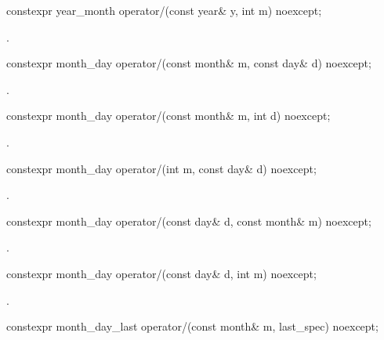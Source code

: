 \begin{itemdecl}
constexpr year_month
  operator/(const year& y, int   m) noexcept;
\end{itemdecl}

\begin{itemdescr}
\pnum
\returns
{}.
\end{itemdescr}

\begin{itemdecl}
constexpr month_day
  operator/(const month& m, const day& d) noexcept;
\end{itemdecl}

\begin{itemdescr}
\pnum
\returns
{}.
\end{itemdescr}

\begin{itemdecl}
constexpr month_day
  operator/(const month& m, int d) noexcept;
\end{itemdecl}

\begin{itemdescr}
\pnum
\returns
{}.
\end{itemdescr}

\begin{itemdecl}
constexpr month_day
  operator/(int m, const day& d) noexcept;
\end{itemdecl}

\begin{itemdescr}
\pnum
\returns
{}.
\end{itemdescr}

\begin{itemdecl}
constexpr month_day
  operator/(const day& d, const month& m) noexcept;
\end{itemdecl}

\begin{itemdescr}
\pnum
\returns
{}.
\end{itemdescr}

\begin{itemdecl}
constexpr month_day
  operator/(const day& d, int m) noexcept;
\end{itemdecl}

\begin{itemdescr}
\pnum
\returns
{}.
\end{itemdescr}

\begin{itemdecl}
constexpr month_day_last
  operator/(const month& m, last_spec) noexcept;
\end{itemdecl}

